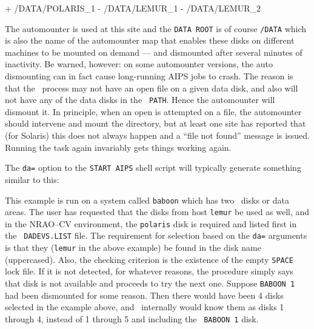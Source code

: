 \fortran
+  /DATA/POLARIS_1
-  /DATA/LEMUR_1
-  /DATA/LEMUR_2
\endfortran
\medskip

\noindent The automounter is used at this site and the
{\tt\dol DATA ROOT} is of course {\tt /DATA} which is also the name of
the automounter map that enables these disks on different machines to
be mounted on demand --- and dismounted after several minutes of
inactivity.  Be warned, however: on some automounter versions, the
auto dismounting can in fact cause long-running AIPS jobs to crash.  The
reason is that the \AIPS\ process may not have an open file on a given
data disk, and also will not have any of the data disks in the {\tt
PATH}.  Hence the automounter will dismount it.  In principle, when an
open is attempted on a file, the automounter should intervene and mount
the directory, but at least one site has reported that (for Solaris)
this does not always happen and a ``file not found'' message is issued.
Running the task again invariably gets things working again.

The {\tt da=} option to the {\tt START AIPS} shell script will
typically generate something similar to this:\medskip

\medskip

\noindent This example is run on a system called {\tt baboon} which has
two \AIPS\ disks or data areas.  The user has requested that the disks
from host {\tt lemur} be used as well, and in the NRAO--CV environment,
the {\tt polaris} disk is required and listed first in the {\tt
DADEVS.LIST} file.  The requirement for selection based on the {\tt da=}
arguments is that they ({\tt lemur} in the above example) be found in
the disk name (uppercased).  Also, the checking criterion is the
existence of the empty {\tt SPACE} lock file.  If it is not detected,
for whatever reasons, the procedure simply says that disk is not
available and proceeds to try the next one.  Suppose {\tt BABOON 1} had
been dismounted for some reason.  Then there would have been 4 disks
selected in the example above, and \AIPS\ internally would know them as
disks 1 through 4, instead of 1 through 5 and including the {\tt
BABOON 1} disk.

